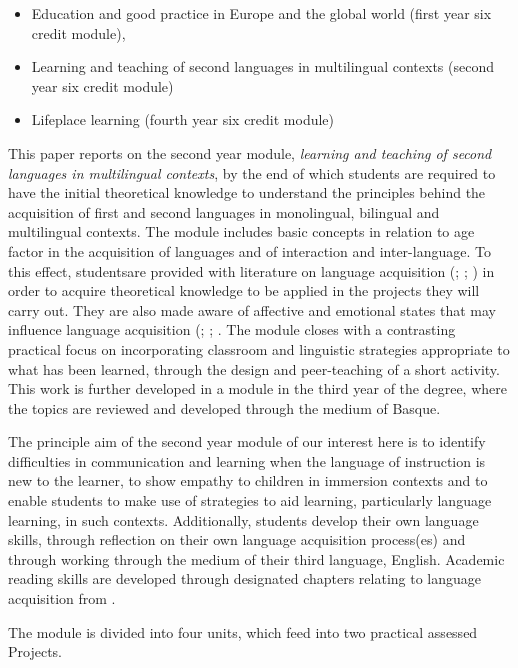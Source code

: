 \documentclass[output=paper]{../langscibook}
\begin{document}
\begin{itemize}
\item Education and good practice in Europe and the global world (first year six credit module), 
\item Learning and teaching of second languages in multilingual contexts (second year six credit module) 
\item Lifeplace learning (fourth year six credit module) 
\end{itemize}

This paper reports on the second year module, \emph{learning and teaching of second languages in multilingual contexts}, by the end of which students are required to have the initial theoretical knowledge to understand the principles behind the acquisition of first and second languages in monolingual, bilingual and multilingual contexts. The module includes basic concepts in relation to age factor in the acquisition of languages and of interaction and inter-language. To this effect, studentsare provided with literature on language acquisition (\citealt{Genesee1994}; \citealt{LightbownSpada2013}; \citealt{Palenham2004}) in order to acquire theoretical knowledge to be applied in the projects they will carry out. They are also made aware of affective and emotional states that may influence language acquisition (\citealt{Barnes2006}; \citealt{DeHouwer2009,DeHouwer2009b}; \citealt{Dewaele2013}. The module closes with a contrasting practical focus on incorporating classroom and linguistic strategies appropriate to what has been learned, through the design and peer-teaching of a short activity. This work is further developed in a module in the third year of the degree, where the topics are reviewed and developed through the medium of Basque.

The principle aim of the second year module of our interest here is to identify difficulties in communication and learning when the language of instruction is new to the learner, to show empathy to children in immersion contexts and to enable students to make use of strategies to aid learning, particularly language learning, in such contexts. Additionally, students develop their own language skills, through reflection on their own language acquisition process(es) and through working through the medium of their third language, English. Academic reading skills are developed through designated chapters relating to language acquisition from \citet{Palenham2004}.

The module is divided into four units, which feed into two practical assessed Projects.
\end{document}
